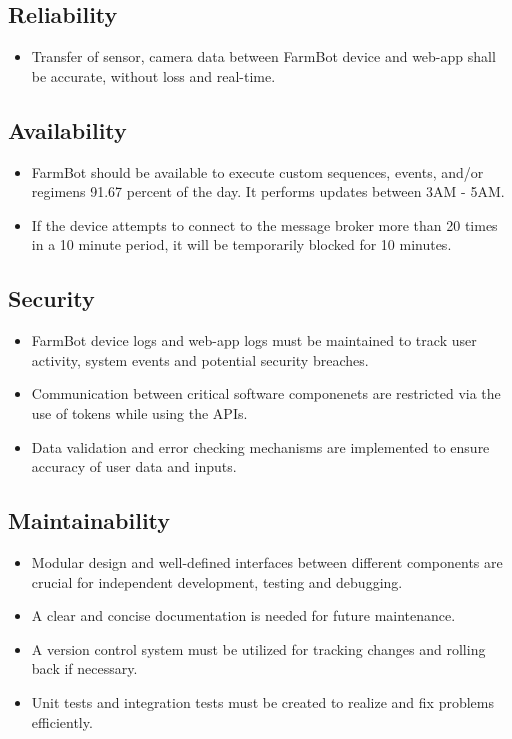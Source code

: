 \subsection{Reliability}
\begin{itemize}
    \item Transfer of sensor, camera data between FarmBot device and web-app shall be accurate, without loss and real-time.
\end{itemize}

\subsection{Availability}
\begin{itemize}
    \item FarmBot should be available to execute custom sequences, events, and/or regimens 91.67 percent of the day. It performs updates between 3AM - 5AM.
    \item If the device attempts to connect to the message broker more than 20 times in a 10 minute period, it will be temporarily blocked for 10 minutes.
\end{itemize}

\subsection{Security}
\begin{itemize}
    \item FarmBot device logs and web-app logs must be maintained to track user activity, system events and potential security breaches.
    \item Communication between critical software componenets are restricted via the use of tokens while using the APIs.
    \item Data validation and error checking mechanisms are implemented to ensure accuracy of user data and inputs.
\end{itemize}

\subsection{Maintainability}
\begin{itemize}
    \item Modular design and well-defined interfaces between different components are crucial for independent development, testing and debugging.
    \item A clear and concise documentation is needed for future maintenance.
    \item A version control system must be utilized for tracking changes and rolling back if necessary.
    \item Unit tests and integration tests must be created to realize and fix problems efficiently.
\end{itemize}

